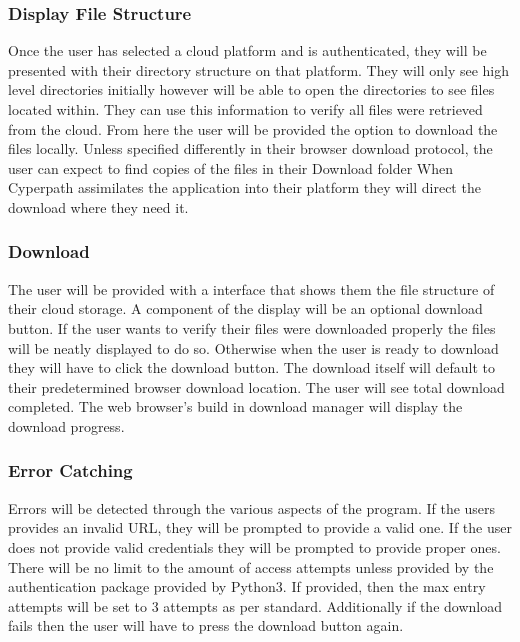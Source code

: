 \documentclass{article}
\begin{document}

            \subsubsection{Display File Structure}
            Once the user has selected a cloud platform and is authenticated, they will be presented with their directory structure on that platform. They will only see high level directories initially
            however will be able to open the directories to see files located within. They can use this information to verify all files were retrieved from the cloud. From here the user will be 
            provided the option to download the files locally. Unless specified differently in their browser download protocol, the user can expect to find copies of the files in their Download folder
            When Cyperpath assimilates the application into their platform they will direct the download where they need it.

            \subsubsection{Download}
            The user will be provided with a interface that shows them the file structure of their cloud storage. A component of the display will be an optional download button. If the user wants to verify
            their files were downloaded properly the files will be neatly displayed to do so. Otherwise when the user is ready to download they will have to click the download button. The download itself 
            will default to their predetermined browser download location. The user will see total download completed. The web browser's build in download manager will display the download progress.

            \subsubsection{Error Catching}
            Errors will be detected through the various aspects of the program. If the users provides an invalid URL, they will be prompted to provide a valid one. If the user does not provide valid credentials
            they will be prompted to provide proper ones. There will be no limit to the amount of access attempts unless provided by the authentication package provided by Python3. If provided, then the max entry
            attempts will be set to 3 attempts as per standard. Additionally if the download fails then the user will have to press the download button again.
\end{document}
